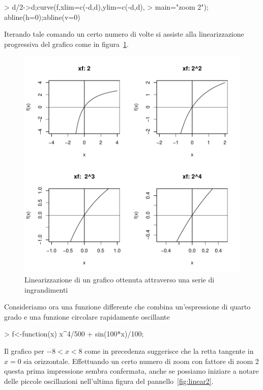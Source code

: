 \documentclass[onecolumn,11pt]{book}
\begin{document}
\begin{Schunk}
\begin{Sinput}
> d/2->d;curve(f,xlim=c(-d,d),ylim=c(-d,d),
> main="zoom 2"); abline(h=0);abline(v=0)
\end{Sinput}
\end{Schunk}
Iterando tale comando un certo numero di volte si assiste alla linearizzazione progressiva del grafico come in figura~\ref{fig:lin3}. 
\begin{center}
\begin{figure}
\includegraphics{statisticaconR-082}
\caption{Linearizzazione di un grafico ottenuta attraverso una serie di ingrandimenti}
\label{fig:lin3}
\end{figure}
\end{center}
Consideriamo ora una funzione differente che combina un'espressione di quarto grado e una funzione circolare rapidamente oscillante
\begin{Schunk}
\begin{Sinput}
> f<-function(x) x^4/500 + sin(100*x)/100;
\end{Sinput}
\end{Schunk}
Il grafico per $-8<x<8$ come in precedenza  suggerisce che la  retta tangente  in $x=0$ sia orizzontale.   
Effettuando un certo numero di zoom con fattore di zoom 2 questa prima impressione sembra confermata, anche se possiamo iniziare a notare delle piccole oscillazioni nell'ultima figura del pannello~\ref{fig:linear2}.
\end{document}
